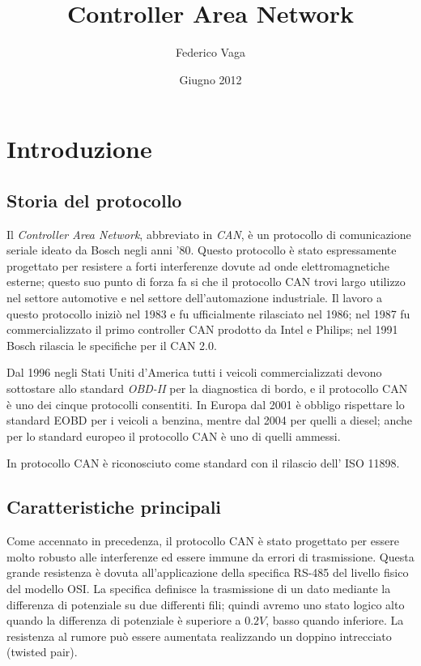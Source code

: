 \documentclass[a4paper,10pt]{book}
\title{Controller Area Network}
\author{Federico Vaga}
\date{Giugno 2012}
\begin{document}


\tableofcontents
\listoffigures

\chapter{Introduzione}
\section{Storia del protocollo}
Il \textit{Controller Area Network}, abbreviato in \textit{CAN}, è un
protocollo di comunicazione seriale ideato da Bosch negli anni '80.
Questo protocollo è stato espressamente progettato per resistere a
forti interferenze dovute ad onde elettromagnetiche esterne; questo
suo punto di forza fa si che il protocollo CAN trovi largo utilizzo
nel settore automotive e nel settore dell'automazione industriale.
Il lavoro a questo protocollo iniziò nel 1983 e fu ufficialmente
rilasciato nel 1986; nel 1987 fu commercializzato il primo controller
CAN prodotto da Intel e Philips; nel 1991 Bosch rilascia le
specifiche per il CAN 2.0.
\newline

Dal 1996 negli Stati Uniti d'America tutti i veicoli commercializzati
devono sottostare allo standard \textit{OBD-II} per la diagnostica di
bordo, e il protocollo CAN è uno dei cinque protocolli consentiti. In
Europa dal 2001 è obbligo rispettare lo standard EOBD per i veicoli a
benzina, mentre dal 2004 per quelli a diesel; anche per lo standard
europeo il protocollo CAN è uno di quelli ammessi.
\newline

In protocollo CAN è riconosciuto come standard con il rilascio dell'
ISO 11898.

\section{Caratteristiche principali}
Come accennato in precedenza, il protocollo CAN è stato progettato
per essere molto robusto alle interferenze ed essere immune da errori
di trasmissione. Questa grande resistenza è dovuta all'applicazione
della specifica RS-485 del livello fisico del modello OSI. La
specifica definisce la trasmissione di un dato mediante la differenza
di potenziale su due differenti fili; quindi avremo uno stato logico
alto quando la differenza di potenziale è superiore a $0.2V$, basso
quando inferiore. La resistenza al rumore può essere aumentata
realizzando un doppino intrecciato (twisted pair).
\newline
\end{document}
